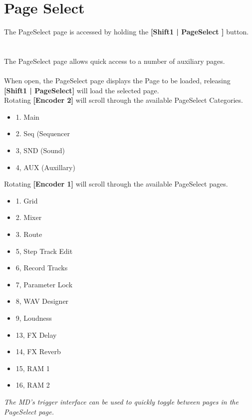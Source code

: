 \chapter{Page Select}
The PageSelect page is accessed by holding the \textbf{[Shift1 | PageSelect ]} button.
\\
\\
\\
The PageSelect page allows quick access to a number of auxiliary pages.\\
\\
When open, the PageSelect page displays the Page to be loaded, releasing \textbf{[Shift1 | PageSelect]} will load
the selected page.
\\
Rotating \textbf{[Encoder 2]} will scroll through the available PageSelect Categories.
\\
\begin{itemize}
	\item{1. Main}
	\item{2. Seq (Sequencer}
	\item{3, SND (Sound)}
	\item{4, AUX (Auxillary)}
\end{itemize}
Rotating \textbf{[Encoder 1]} will scroll through the available PageSelect pages.
\\
\begin{itemize}
    \item{1. Grid}
	\item{2. Mixer}
	\item{3. Route}
	\item{5, Step Track Edit}
	\item{6, Record Tracks}
    \item{7, Parameter Lock}
	\item{8, WAV Designer}
    \item{9, Loudness}
    \item{13, FX Delay}
    \item{14, FX Reverb}
    \item{15, RAM 1}
    \item{16, RAM 2}
\end{itemize}

\textit{The MD's trigger interface can be used to quickly toggle between pages in the PageSelect page. }






